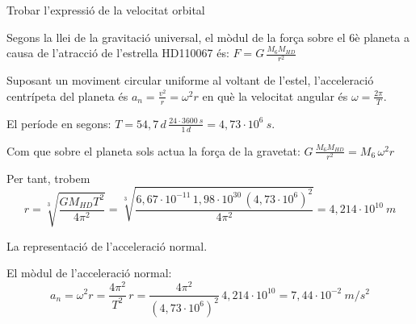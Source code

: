 \begin{solapartat}
Trobar l'expressió de la velocitat orbital

 Segons la llei de la gravitació universal, el mòdul de la força sobre el 6è planeta a causa de l'atracció de l'estrella HD110067 és: $F = G\,\frac{M_6 M_{HD}}{r^2}$

 Suposant un moviment circular uniforme al voltant de l'estel, l'acceleració centrípeta del planeta és $a_n = \frac{v^2}{r} = \omega^2 r$ en què la velocitat angular és $\omega = \frac{2\pi}{T}$.

 El període en segons: $T = 54,7\,d\,\frac{24\cdot 3600\ s}{1\,d} = 4,73\cdot 10^{6}\ s$.

 Com que sobre el planeta sols actua la força de la gravetat: $G\,\frac{M_6 M_{HD}}{r^2} = M_6\,\omega^2 r$

Per tant, trobem
\[ r = \sqrt[3]{\frac{G M_{HD} T^2}{4\pi^2}} = \sqrt[3]{\frac{6,67\cdot 10^{-11}\,1,98\cdot 10^{30}\,(4,73\cdot 10^{6})^2}{4\pi^2}} = 4,214\cdot 10^{10}\ m \]

 La representació de l'acceleració normal.

 El mòdul de l'acceleració normal:
\[ a_n = \omega^2 r = \frac{4\pi^2}{T^2}\,r = \frac{4\pi^2}{(4,73\cdot 10^{6})^2}\,4,214\cdot 10^{10} = 7,44\cdot 10^{-2}\ m/s^2 \]
\end{solapartat}

